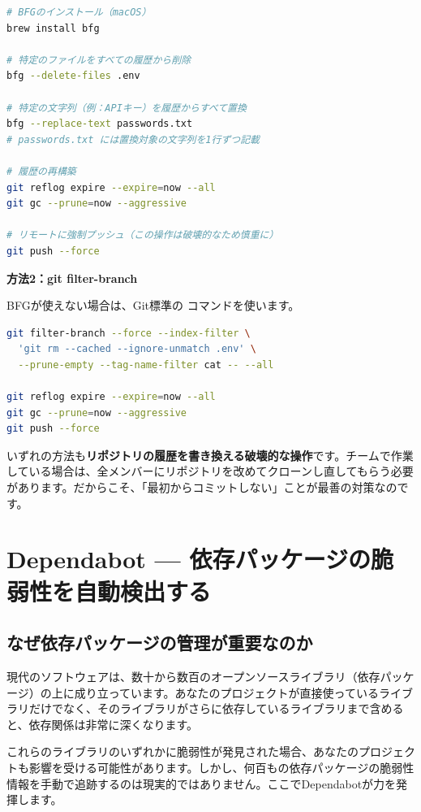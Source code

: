 \begin{lstlisting}[language=bash]
# BFGのインストール（macOS）
brew install bfg

# 特定のファイルをすべての履歴から削除
bfg --delete-files .env

# 特定の文字列（例：APIキー）を履歴からすべて置換
bfg --replace-text passwords.txt
# passwords.txt には置換対象の文字列を1行ずつ記載

# 履歴の再構築
git reflog expire --expire=now --all
git gc --prune=now --aggressive

# リモートに強制プッシュ（この操作は破壊的なため慎重に）
git push --force
\end{lstlisting}

\textbf{方法2：git filter-branch}

BFGが使えない場合は、Git標準の  コマンドを使います。

\begin{lstlisting}[language=bash]
git filter-branch --force --index-filter \
  'git rm --cached --ignore-unmatch .env' \
  --prune-empty --tag-name-filter cat -- --all

git reflog expire --expire=now --all
git gc --prune=now --aggressive
git push --force
\end{lstlisting}

いずれの方法も\textbf{リポジトリの履歴を書き換える破壊的な操作}です。チームで作業している場合は、全メンバーにリポジトリを改めてクローンし直してもらう必要があります。だからこそ、「最初からコミットしない」ことが最善の対策なのです。

\section{Dependabot --- 依存パッケージの脆弱性を自動検出する}

\subsection{なぜ依存パッケージの管理が重要なのか}

現代のソフトウェアは、数十から数百のオープンソースライブラリ（依存パッケージ）の上に成り立っています。あなたのプロジェクトが直接使っているライブラリだけでなく、そのライブラリがさらに依存しているライブラリまで含めると、依存関係は非常に深くなります。

これらのライブラリのいずれかに脆弱性が発見された場合、あなたのプロジェクトも影響を受ける可能性があります。しかし、何百もの依存パッケージの脆弱性情報を手動で追跡するのは現実的ではありません。ここでDependabotが力を発揮します。

